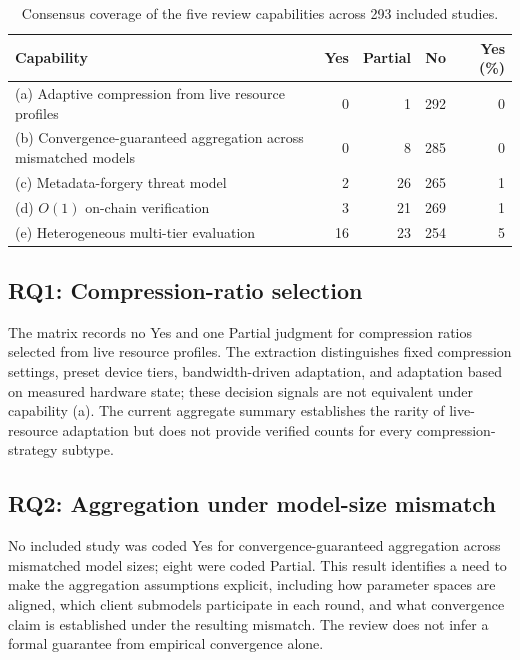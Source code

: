 \documentclass[journal]{IEEEtran}
\begin{document}
\begin{table}[!t]
\centering
\caption{Consensus coverage of the five review capabilities across 293 included studies.}
\label{tab:capability}
\begin{tabular}{p{}rrrr}
\toprule
\textbf{Capability} & \textbf{Yes} & \textbf{Partial} & \textbf{No} & \textbf{Yes (\%)} \\
\midrule
(a) Adaptive compression from live resource profiles & 0 & 1 & 292 & 0 \\
(b) Convergence-guaranteed aggregation across mismatched models & 0 & 8 & 285 & 0 \\
(c) Metadata-forgery threat model & 2 & 26 & 265 & 1 \\
(d) $O(1)$ on-chain verification & 3 & 21 & 269 & 1 \\
(e) Heterogeneous multi-tier evaluation & 16 & 23 & 254 & 5 \\
\bottomrule
\end{tabular}
\end{table}

\subsection{RQ1: Compression-ratio selection}
\label{subsec:rq1}

The matrix records no Yes and one Partial judgment for compression ratios selected from live resource profiles. The extraction distinguishes fixed compression settings, preset device tiers, bandwidth-driven adaptation, and adaptation based on measured hardware state; these decision signals are not equivalent under capability (a). The current aggregate summary establishes the rarity of live-resource adaptation but does not provide verified counts for every compression-strategy subtype.

\subsection{RQ2: Aggregation under model-size mismatch}
\label{subsec:rq2}

No included study was coded Yes for convergence-guaranteed aggregation across mismatched model sizes; eight were coded Partial. This result identifies a need to make the aggregation assumptions explicit, including how parameter spaces are aligned, which client submodels participate in each round, and what convergence claim is established under the resulting mismatch. The review does not infer a formal guarantee from empirical convergence alone.
\end{document}
